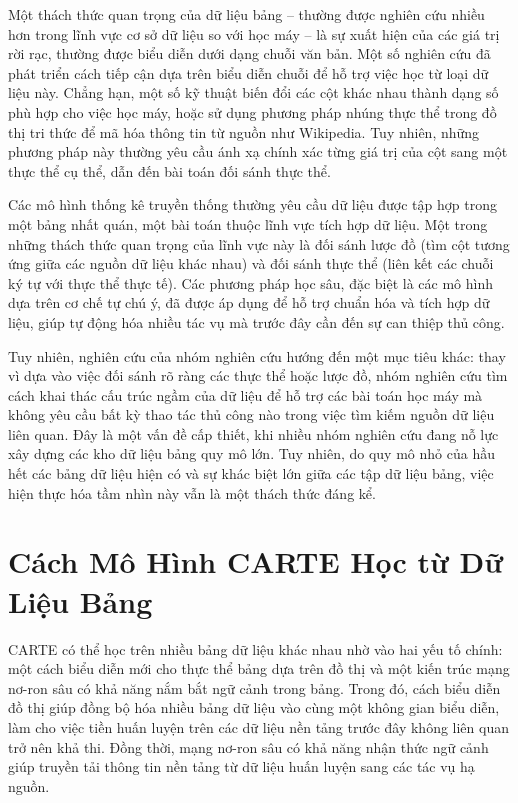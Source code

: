 \documentclass{article}
\begin{document}
Một thách thức quan trọng của dữ liệu bảng – thường được nghiên cứu nhiều hơn trong lĩnh vực cơ sở dữ liệu so với học máy – là sự xuất hiện của các giá trị rời rạc, thường được biểu diễn dưới dạng chuỗi văn bản. Một số nghiên cứu đã phát triển cách tiếp cận dựa trên biểu diễn chuỗi để hỗ trợ việc học từ loại dữ liệu này. Chẳng hạn, một số kỹ thuật biến đổi các cột khác nhau thành dạng số phù hợp cho việc học máy, hoặc sử dụng phương pháp nhúng thực thể trong đồ thị tri thức để mã hóa thông tin từ nguồn như Wikipedia. Tuy nhiên, những phương pháp này thường yêu cầu ánh xạ chính xác từng giá trị của cột sang một thực thể cụ thể, dẫn đến bài toán đối sánh thực thể.

Các mô hình thống kê truyền thống thường yêu cầu dữ liệu được tập hợp trong một bảng nhất quán, một bài toán thuộc lĩnh vực tích hợp dữ liệu. Một trong những thách thức quan trọng của lĩnh vực này là đối sánh lược đồ (tìm cột tương ứng giữa các nguồn dữ liệu khác nhau) và đối sánh thực thể (liên kết các chuỗi ký tự với thực thể thực tế). Các phương pháp học sâu, đặc biệt là các mô hình dựa trên cơ chế tự chú ý, đã được áp dụng để hỗ trợ chuẩn hóa và tích hợp dữ liệu, giúp tự động hóa nhiều tác vụ mà trước đây cần đến sự can thiệp thủ công.

Tuy nhiên, nghiên cứu của nhóm nghiên cứu hướng đến một mục tiêu khác: thay vì dựa vào việc đối sánh rõ ràng các thực thể hoặc lược đồ, nhóm nghiên cứu tìm cách khai thác cấu trúc ngầm của dữ liệu để hỗ trợ các bài toán học máy mà không yêu cầu bất kỳ thao tác thủ công nào trong việc tìm kiếm nguồn dữ liệu liên quan. Đây là một vấn đề cấp thiết, khi nhiều nhóm nghiên cứu đang nỗ lực xây dựng các kho dữ liệu bảng quy mô lớn. Tuy nhiên, do quy mô nhỏ của hầu hết các bảng dữ liệu hiện có và sự khác biệt lớn giữa các tập dữ liệu bảng, việc hiện thực hóa tầm nhìn này vẫn là một thách thức đáng kể.

\section{Cách Mô Hình CARTE Học từ Dữ Liệu Bảng}
CARTE có thể học trên nhiều bảng dữ liệu khác nhau nhờ vào hai yếu tố chính: một cách biểu diễn mới cho thực thể bảng dựa trên đồ thị và một kiến trúc mạng nơ-ron sâu có khả năng nắm bắt ngữ cảnh trong bảng. Trong đó, cách biểu diễn đồ thị giúp đồng bộ hóa nhiều bảng dữ liệu vào cùng một không gian biểu diễn, làm cho việc tiền huấn luyện trên các dữ liệu nền tảng trước đây không liên quan trở nên khả thi. Đồng thời, mạng nơ-ron sâu có khả năng nhận thức ngữ cảnh giúp truyền tải thông tin nền tảng từ dữ liệu huấn luyện sang các tác vụ hạ nguồn.
\end{document}
